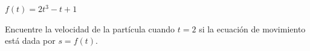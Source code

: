 \item $f(t) = 2t^3 - t + 1$
\par
Encuentre la velocidad de la partícula cuando $t = 2$ si la ecuación de movimiento está dada por $s = f(t)$.
